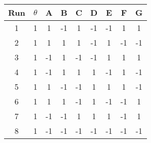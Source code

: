 \begin{table}[]
    \centering
    \begin{tabular}{@{\kern\tabcolsep}ccccccccc@{\kern\tabcolsep}}
        \toprule
        Run & $\theta$ & A & B & C & D & E & F & G \\ \midrule
        \cellcolor{gray!18}1 & \cellcolor{blue!12}1 & \cellcolor{green!25}1 & \cellcolor{red!25}-1 & \cellcolor{green!25}1 & \cellcolor{red!25}-1 & \cellcolor{red!25}-1 & \cellcolor{green!25}1 & \cellcolor{green!25}1 \\
        \cellcolor{gray!18}2 & \cellcolor{blue!12}1 & \cellcolor{green!25}1 & \cellcolor{green!25}1 & \cellcolor{green!25}1 & \cellcolor{red!25}-1 & \cellcolor{green!25}1 & \cellcolor{red!25}-1 & \cellcolor{red!25}-1 \\
        \cellcolor{gray!18}3 & \cellcolor{blue!12}1 & \cellcolor{red!25}-1 & \cellcolor{green!25}1 & \cellcolor{red!25}-1 & \cellcolor{red!25}-1 & \cellcolor{green!25}1 & \cellcolor{green!25}1 & \cellcolor{green!25}1 \\
        \cellcolor{gray!18}4 & \cellcolor{blue!12}1 & \cellcolor{red!25}-1 & \cellcolor{green!25}1 & \cellcolor{green!25}1 & \cellcolor{green!25}1 & \cellcolor{red!25}-1 & \cellcolor{green!25}1 & \cellcolor{red!25}-1 \\
        \cellcolor{gray!18}5 & \cellcolor{blue!12}1 & \cellcolor{green!25}1 & \cellcolor{red!25}-1 & \cellcolor{red!25}-1 & \cellcolor{green!25}1 & \cellcolor{green!25}1 & \cellcolor{green!25}1 & \cellcolor{red!25}-1 \\
        \cellcolor{gray!18}6 & \cellcolor{blue!12}1 & \cellcolor{green!25}1 & \cellcolor{green!25}1 & \cellcolor{red!25}-1 & \cellcolor{green!25}1 & \cellcolor{red!25}-1 & \cellcolor{red!25}-1 & \cellcolor{green!25}1 \\
        \cellcolor{gray!18}7 & \cellcolor{blue!12}1 & \cellcolor{red!25}-1 & \cellcolor{red!25}-1 & \cellcolor{green!25}1 & \cellcolor{green!25}1 & \cellcolor{green!25}1 & \cellcolor{red!25}-1 & \cellcolor{green!25}1 \\
        \cellcolor{gray!18}8 & \cellcolor{blue!12}1 & \cellcolor{red!25}-1 & \cellcolor{red!25}-1 & \cellcolor{red!25}-1 & \cellcolor{red!25}-1 & \cellcolor{red!25}-1 & \cellcolor{red!25}-1 & \cellcolor{red!25}-1  \\ \bottomrule
    \end{tabular}
\end{table}
